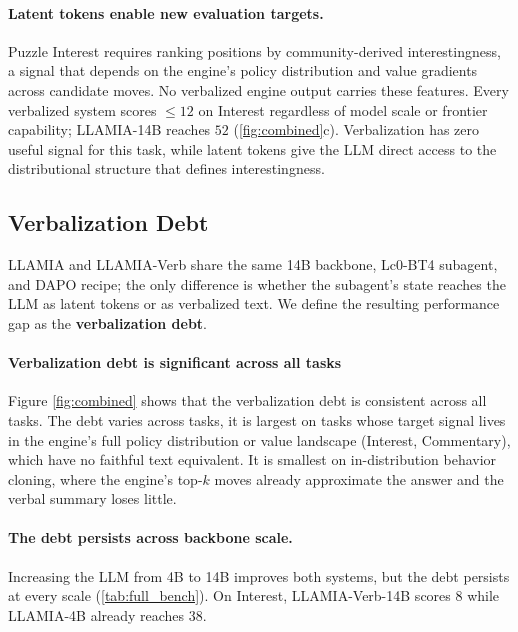 \paragraph{Latent tokens enable new evaluation targets.}
Puzzle Interest requires ranking positions by community-derived interestingness, a signal that depends on the engine's policy distribution and value gradients across candidate moves.
No verbalized engine output carries these features.
Every verbalized system scores ${\leq}12$ on Interest regardless of model scale or frontier capability; LLAMIA-14B reaches $52$ (\cref{fig:combined}c).
Verbalization has zero useful signal for this task, while latent tokens give the LLM direct access to the distributional structure that defines interestingness.


\subsection{Verbalization Debt}
\label{sec:results_vd}

LLAMIA and LLAMIA-Verb share the same 14B backbone, Lc0-BT4 subagent, and DAPO recipe; the only difference is whether the subagent's state reaches the LLM as latent tokens or as verbalized text. We define the resulting performance gap as the \textbf{verbalization debt}.

\paragraph{Verbalization debt is significant across all tasks}
Figure \ref{fig:combined} shows that the verbalization debt is consistent across all tasks. The debt varies across tasks, it is largest on tasks whose target signal lives in the engine's full policy distribution or value landscape (Interest, Commentary), which have no faithful text equivalent. It is smallest on in-distribution behavior cloning, where the engine's top-$k$ moves already approximate the answer and the verbal summary loses little.

\paragraph{The debt persists across backbone scale.}
Increasing the LLM from 4B to 14B improves both systems, but the debt persists at every scale (\cref{tab:full_bench}). On Interest, LLAMIA-Verb-14B scores $8$ while LLAMIA-4B already reaches $38$.


